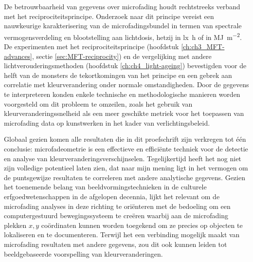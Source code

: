 De betrouwbaarheid van gegevens over microfading houdt rechtstreeks verband met het reciprociteitsprincipe. Onderzoek naar dit principe vereist een nauwkeurige karakterisering van de microfadingsbundel in termen van spectrale vermogensverdeling en blootstelling aan lichtdosis, hetzij in \unit{\lux\hour} of in \unit{\mega\joule\per\square\metre}. De experimenten met het reciprociteitsprincipe (hoofdstuk \ref{ch:ch3_MFT-advances}, sectie \ref{sec:MFT-reciprocity}) en de vergelijking met andere lichtverouderingsmethoden (hoofdstuk \ref{ch:ch4_light-ageing}) bevestigden voor de helft van de monsters de tekortkomingen van het principe en een gebrek aan correlatie met kleurverandering onder normale omstandigheden. Door de gegevens te interpreteren konden enkele technische en methodologische manieren worden voorgesteld om dit probleem te omzeilen, zoals het gebruik van kleurveranderingssnelheid als een meer geschikte metriek voor het toepassen van microfading data op kunstwerken in het kader van verlichtingsbeleid.

Globaal gezien komen alle resultaten die in dit proefschrift zijn verkregen tot één conclusie: microfadeometrie is een effectieve en efficiënte techniek voor de detectie en analyse van kleurveranderingsverschijnselen. Tegelijkertijd heeft het nog niet zijn volledige potentieel laten zien, dat naar mijn mening ligt in het vermogen om de puntsgewijze resultaten te correleren met andere analytische gegevens. Gezien het toenemende belang van beeldvormingstechnieken in de culturele erfgoedwetenschappen in de afgelopen decennia, lijkt het relevant om de microfading analyses in deze richting te oriënteren met de bedoeling om een computergestuurd bewegingssysteem te creëren waarbij aan de microfading plekken $x,y$ coördinaten kunnen worden toegekend om ze precies op objecten te lokaliseren en te documenteren. Terwijl het een verbinding mogelijk maakt van microfading resultaten met andere gegevens, zou dit ook kunnen leiden tot beeldgebaseerde voorspelling van kleurveranderingen.





